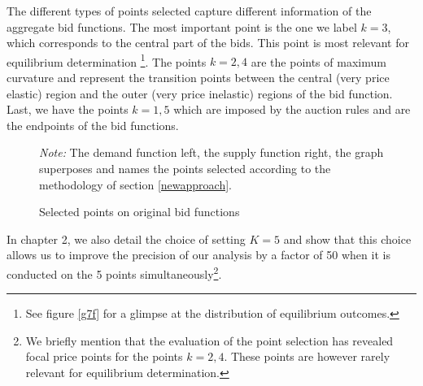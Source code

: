 The different types of points selected capture different information of the aggregate bid functions. The most important point is the one we label $k=3$, which corresponds to the central part of the bids. This point is most relevant for equilibrium determination \footnote{See figure \ref{g7f} for a glimpse at the distribution of equilibrium outcomes.}. The points $k=2,4$ are the points of maximum curvature and represent the transition points between the central (very price elastic) region and the outer (very price inelastic) regions of the bid function. Last, we have the points $k=1,5$ which are imposed by the auction rules and are the endpoints of the bid functions. \\

\begin{figure}[!ht]
\begin{center} 
\end{center}
\caption{Selected points on original bid functions}
\emph{Note: } The demand function left, the supply function right, the graph superposes and names the points selected according to the methodology of section \ref{newapproach}.
\label{TypeallocK}
\end{figure}
 
In chapter 2, we also detail the choice of setting $K=5$ and show that this choice allows us to improve the precision of our analysis by a factor of 50 when it is conducted on the 5 points simultaneously\footnote{We briefly mention that the evaluation of the point selection has revealed focal price points for the points $k=2,4$. These points are however rarely relevant for equilibrium determination.}.



